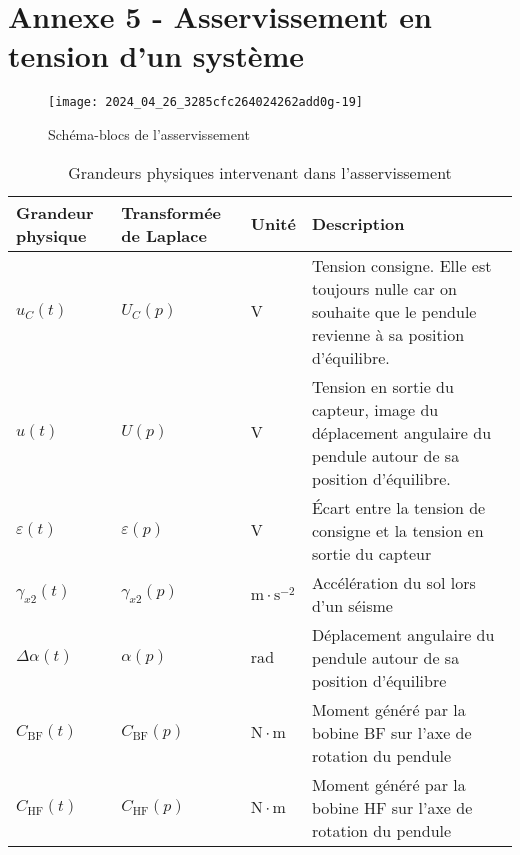 \newpage

\section*{Annexe 5 - Asservissement en tension d'un système}


\begin{figure}[!h]
\centering
\texttt{[image: 2024\_04\_26\_3285cfc264024262add0g-19]}
\caption{Schéma-blocs de l'asservissement}
\end{figure}


\begin{table}[!h]
\centering
\begin{tabular}{p{2cm}p{2cm}p{1cm}p{10cm}}
\hline
Grandeur physique & Transformée de Laplace  & Unité & Description \\
\hline
$u_{C}(t)$ & $U_{C}(p)$ & $\mathrm{V}$ & Tension consigne. Elle est toujours nulle car on souhaite que le pendule revienne à sa position d'équilibre.  \\
\hline
$u(t)$ & $U(p)$ & $\mathrm{V}$ & Tension en sortie du capteur, image du déplacement angulaire du pendule autour de sa position d'équilibre. \\
\hline
$\varepsilon(t)$ & $\varepsilon(p)$ & $\mathrm{V}$ & Écart entre la tension de consigne et la tension en sortie du capteur  \\
\hline
$\gamma_{x 2}(t)$ & $\gamma_{x 2}(p)$ & $\mathrm{m} \cdot \mathrm{s}^{-2}$ & Accélération du sol lors d'un séisme \\
\hline
$\Delta \alpha(t)$ & $\alpha(p)$ & $\mathrm{rad}$ & Déplacement angulaire du pendule autour de sa position d'équilibre \\
\hline
$C_{\mathrm{BF}}(t)$ & $C_{\mathrm{BF}}(p)$ & $\mathrm{N} \cdot \mathrm{m}$ & Moment généré par la bobine BF sur l'axe de rotation du pendule \\
\hline
$C_{\mathrm{HF}}(t)$ & $C_{\mathrm{HF}}(p)$ & $\mathrm{N} \cdot \mathrm{m}$ & Moment généré par la bobine HF sur l'axe de rotation du pendule \\
\hline
\end{tabular}
\caption{Grandeurs physiques intervenant dans l'asservissement}

\end{table}

